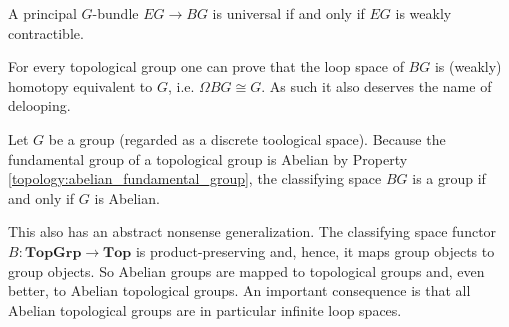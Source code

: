     \begin{property}
        A principal $G$-bundle $EG\rightarrow BG$ is universal if and only if $EG$ is weakly contractible.
    \end{property}
    \begin{property}[Delooping]\label{diff:delooping}
        For every topological group one can prove that the loop space of $BG$ is (weakly) homotopy equivalent to $G$, i.e. $\Omega BG\cong G$. As such it also deserves the name of delooping.
    \end{property}
    \begin{property}[Groups]
            Let $G$ be a group (regarded as a discrete toological space). Because the fundamental group of a topological group is Abelian by Property \ref{topology:abelian_fundamental_group}, the classifying space $BG$ is a group if and only if $G$ is Abelian.

            This also has an abstract nonsense generalization. The classifying space functor $B:\mathbf{TopGrp}\rightarrow\mathbf{Top}$ is product-preserving and, hence, it maps group objects to group objects. So Abelian groups are mapped to topological groups and, even better, to Abelian topological groups. An important consequence is that all Abelian topological groups are in particular infinite loop spaces.
        \end{property}


